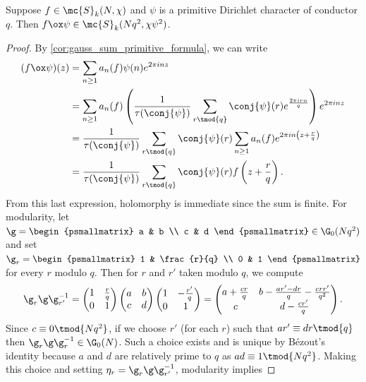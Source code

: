 \documentclass[12pt]{article}
\begin{document}
      \begin{proposition}\label{prop:twisted_modular_forms_primitive}
        Suppose \(f \in \mc{S}_{k}(N,\chi)\) and \(\psi\) is a primitive Dirichlet character of conductor \(q\). Then \(f \ox \psi \in \mc{S}_{k}(Nq^{2},\chi\psi^{2})\).
      \end{proposition}
      \begin{proof}
        By \cref{cor:gauss_sum_primitive_formula}, we can write
        \begin{align*}
          (f \ox \psi)(z) &= \sum_{n \ge 1}a_{n}(f)\psi(n)e^{2\pi inz} \\
          &= \sum_{n \ge 1}a_{n}(f)\left(\frac{1}{\tau(\conj{\psi})}\sum_{r \tmod{q}}\conj{\psi}(r)e^{\frac{2\pi irn}{q}}\right)e^{2\pi inz} \\
          &= \frac{1}{\tau(\conj{\psi})}\sum_{r \tmod{q}}\conj{\psi}(r)\sum_{n \ge 1}a_{n}(f)e^{2\pi in\left(z+\frac{r}{q}\right)} \\
          &= \frac{1}{\tau(\conj{\psi})}\sum_{r \tmod{q}}\conj{\psi}(r)f\left(z+\frac{r}{q}\right).
        \end{align*}
        From this last expression, holomorphy is immediate since the sum is finite. For modularity, let \(\g = \begin{psmallmatrix} a & b \\ c & d \end{psmallmatrix} \in \G_{0}(Nq^{2})\) and set \(\g_{r} = \begin{psmallmatrix} 1 & \frac{r}{q} \\ 0 & 1 \end{psmallmatrix}\) for every \(r\) modulo \(q\). Then for \(r\) and \(r'\) taken modulo \(q\), we compute
        \[
          \g_{r}\g\g_{r'}^{-1} = \begin{pmatrix} 1 & \frac{r}{q} \\ 0 & 1 \end{pmatrix}\begin{pmatrix} a & b \\ c & d \end{pmatrix}\begin{pmatrix} 1 & -\frac{r'}{q} \\ 0 & 1 \end{pmatrix} = \begin{pmatrix} a+\frac{cr}{q} & b-\frac{ar'-dr}{q}-\frac{crr'}{q^{2}} \\ c & d-\frac{cr'}{q} \end{pmatrix}.
        \]
        Since \(c \equiv 0 \tmod{Nq^{2}}\), if we choose \(r'\) (for each \(r\)) such that \(ar' \equiv dr \tmod{q}\) then \(\g_{r}\g\g_{r}^{-1} \in \G_{0}(N)\). Such a choice exists and is unique by B\'ezout's identity because \(a\) and \(d\) are relatively prime to \(q\) as \(ad \equiv 1 \tmod{Nq^{2}}\). Making this choice and setting \(\eta_{r} = \g_{r}\g\g_{r'}^{-1}\), modularity implies

\end{proof}
\end{document}
